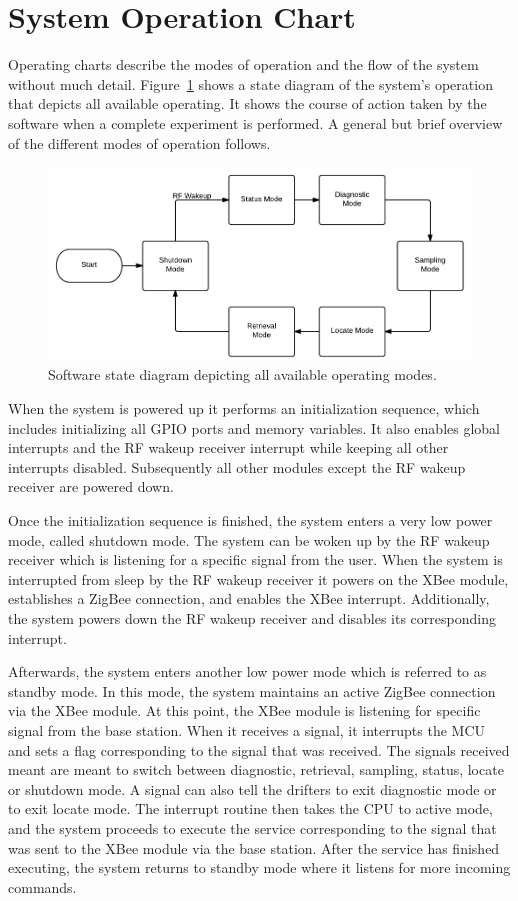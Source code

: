 \section{System Operation Chart}
\label{sec:operatingChart}

Operating charts describe the modes of operation and the flow of the system without much detail. Figure~\ref{fig:systemFlowchart} shows a state diagram of the system's operation that depicts all available operating. It shows the course of action taken by the software when a complete experiment is performed. A general but brief overview of the different modes of operation follows.

\begin{figure}[!ht]
	\centering
	\includegraphics[width=\textwidth]{img/stateDiagram}
	\caption{Software state diagram depicting all available operating modes. \label{fig:systemFlowchart}}
\end{figure}

When the system is powered up it performs an initialization sequence, which includes initializing all GPIO ports and memory variables. It also enables global interrupts and the RF wakeup receiver interrupt while keeping all other interrupts disabled. Subsequently all other modules except the RF wakeup receiver are powered down.

Once the initialization sequence is finished, the system enters a very low power mode, called shutdown mode.  The system can be woken up by the RF wakeup receiver which is listening for a specific signal from the user. When the system is interrupted from sleep by the RF wakeup receiver it powers on the XBee module, establishes a ZigBee connection, and enables the XBee interrupt. Additionally, the system powers down the RF wakeup receiver and disables its corresponding interrupt.

Afterwards, the system enters another low power mode which is referred to as standby mode. In this mode, the system maintains an active ZigBee connection via the XBee module. At this point, the XBee module is listening for specific signal from the base station. When it receives a signal, it interrupts the MCU and sets a flag corresponding to the signal that was received. The signals received meant are meant to switch between diagnostic, retrieval, sampling, status, locate or shutdown mode. A signal can also tell the drifters to exit diagnostic mode or to exit locate mode. The interrupt routine then takes the CPU to active mode, and the system proceeds to execute the service corresponding to the signal that was sent to the XBee module via the base station. After the service has finished executing, the system returns to standby mode where it listens for more incoming commands.